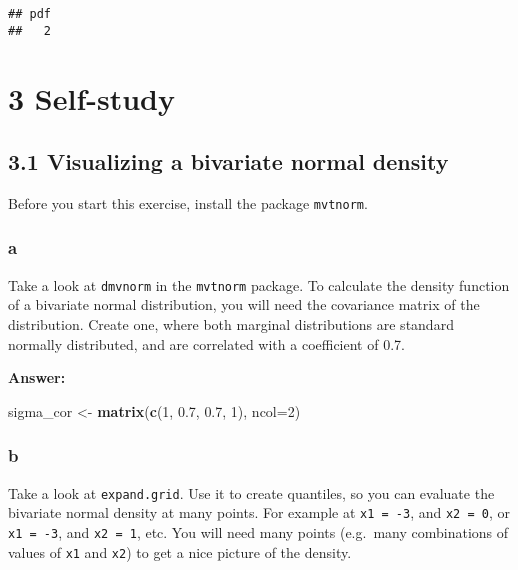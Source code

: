 \documentclass[]{article}
\newenvironment{Shaded}{\begin{snugshade}}{\end{snugshade}}
\newcommand{\DataTypeTok}[1]{\textcolor[rgb]{0.13,0.29,0.53}{#1}}
\newcommand{\DecValTok}[1]{\textcolor[rgb]{0.00,0.00,0.81}{#1}}
\newcommand{\FloatTok}[1]{\textcolor[rgb]{0.00,0.00,0.81}{#1}}
\newcommand{\KeywordTok}[1]{\textcolor[rgb]{0.13,0.29,0.53}{\textbf{#1}}}
\newcommand{\NormalTok}[1]{#1}
\newcommand{\StringTok}[1]{\textcolor[rgb]{0.31,0.60,0.02}{#1}}
\begin{document}
\begin{verbatim}
## pdf 
##   2
\end{verbatim}

\newpage

\hypertarget{self-study}{%
\section{3 Self-study}\label{self-study}}

\hypertarget{visualizing-a-bivariate-normal-density}{%
\subsection{3.1 Visualizing a bivariate normal
density}\label{visualizing-a-bivariate-normal-density}}

Before you start this exercise, install the package \texttt{mvtnorm}.

\hypertarget{a-8}{%
\subsubsection{a}\label{a-8}}

Take a look at \texttt{dmvnorm} in the \texttt{mvtnorm} package. To
calculate the density function of a bivariate normal distribution, you
will need the covariance matrix of the distribution. Create one, where
both marginal distributions are standard normally distributed, and are
correlated with a coefficient of 0.7.

\textbf{Answer:}

\begin{Shaded}
\begin{Highlighting}[]
\NormalTok{sigma_cor <-}\StringTok{ }\KeywordTok{matrix}\NormalTok{(}\KeywordTok{c}\NormalTok{(}\DecValTok{1}\NormalTok{, }\FloatTok{0.7}\NormalTok{, }\FloatTok{0.7}\NormalTok{, }\DecValTok{1}\NormalTok{), }\DataTypeTok{ncol=}\DecValTok{2}\NormalTok{)}
\end{Highlighting}
\end{Shaded}

\hypertarget{b-8}{%
\subsubsection{b}\label{b-8}}

Take a look at \texttt{expand.grid}. Use it to create quantiles, so you
can evaluate the bivariate normal density at many points. For example at
\texttt{x1\ =\ -3}, and \texttt{x2\ =\ 0}, or \texttt{x1\ =\ -3}, and
\texttt{x2\ =\ 1}, etc. You will need many points (e.g.~many
combinations of values of \texttt{x1} and \texttt{x2}) to get a nice
picture of the density.
\end{document}
